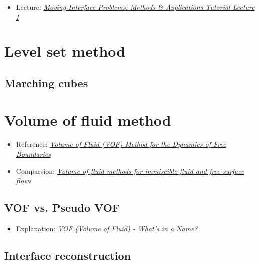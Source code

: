 \documentclass[]{report}
\begin{document}
\begin{itemize}
    \item Lecture: \textit{\href{http://www.ims.nus.edu.sg/Programs/fluiddynamic/files/Lecture1-basics.pdf}{Moving Interface Problems: Methods \& Applications Tutorial Lecture I}}
\end{itemize}

\section{Level set method}

\subsection{Marching cubes}

\section{Volume of fluid method}

\begin{itemize}
    \item Reference: \textit{\href{http://pages.csam.montclair.edu/~yecko/icodes/HirtNichols_Surfer_JCP1981.pdf}{Volume of Fluid (VOF) Method for the Dynamics of Free Boundaries}}
    \item Comparsion: \textit{\href{http://capfluidicslit.mme.pdx.edu/reference/Numerics/Gopala_ChemEngJ2008_VOFMethodsFreeSurfaceFlow.pdf}{Volume of fluid methods for immiscible-fluid and free-surface flows}}
\end{itemize}

\subsection{VOF vs. Pseudo VOF}

\begin{itemize}
    \item Explanation: \textit{\href{http://www.flow3d.com/cfd-101/cfd-101-VOF.html}{VOF (Volume of Fluid) - What's in a Name?}}
\end{itemize}

\subsection{Interface reconstruction}
\end{document}
